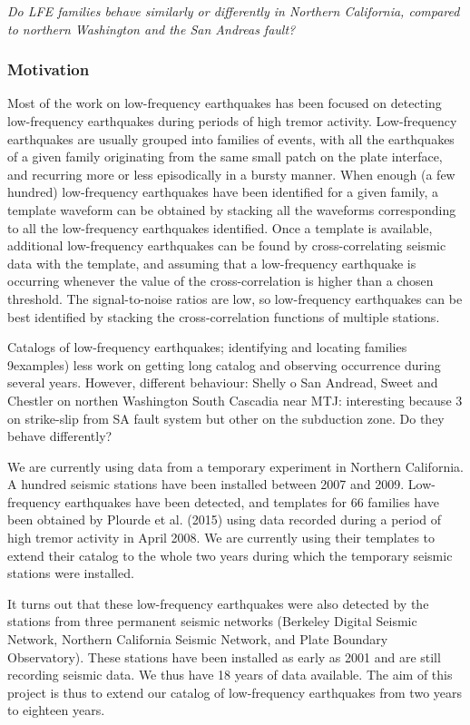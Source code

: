 \documentclass[letterpaper, 12pt]{article}
\begin{document}
\textit{Do LFE families behave similarly or differently in Northern California, compared to northern Washington and the San Andreas fault?}

\subsubsection*{Motivation}

Most of the work on low-frequency earthquakes has been focused on detecting low-frequency earthquakes during periods of high tremor activity. Low-frequency earthquakes are usually grouped into families of events, with all the earthquakes of a given family originating from the same small patch on the plate interface, and recurring more or less episodically in a bursty manner. When enough (a few hundred) low-frequency earthquakes have been identified for a given family, a template waveform can be obtained by stacking all the waveforms corresponding to all the low-frequency earthquakes identified. Once a template is available, additional low-frequency earthquakes can be found by cross-correlating seismic data with the template, and assuming that a low-frequency earthquake is occurring whenever the value of the cross-correlation is higher than a chosen threshold.  The signal-to-noise ratios are low, so low-frequency earthquakes can be best identified by stacking the cross-correlation functions of multiple stations.

Catalogs of low-frequency earthquakes; identifying and locating families 9examples)
less work on getting long catalog and observing occurrence during several years.
However, different behaviour: Shelly o San Andread, Sweet and Chestler on northen Washington
South Cascadia near MTJ: interesting because 3 on strike-slip from SA fault system but other on the subduction zone. Do they behave differently?

We are currently using data from a temporary experiment in Northern California. A hundred seismic stations have been installed between 2007 and 2009. Low-frequency earthquakes have been detected, and templates for 66 families have been obtained by Plourde et al. (2015) using data recorded during a period of high tremor activity in April 2008. We are currently using their templates to extend their catalog to the whole two years during which the temporary seismic stations were installed.

It turns out that these low-frequency earthquakes were also detected by the stations from three permanent seismic networks (Berkeley Digital Seismic Network, Northern California Seismic Network, and Plate Boundary Observatory). These stations have been installed as early as 2001 and are still recording seismic data. We thus have 18 years of data available. The aim of this project is thus to extend our catalog of low-frequency earthquakes from two years to eighteen years.
\end{document}
